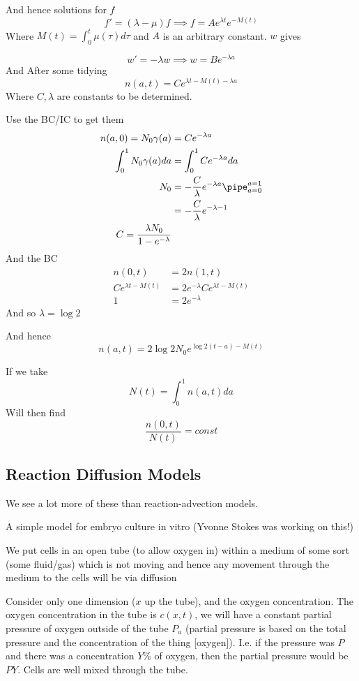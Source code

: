 \documentclass{X:/Documents/Coding/Latex/myassignment}
\begin{document}
And hence solutions for $f$
\[f' = (\lambda - \mu) f \implies f = Ae^{\lambda t} e^{-M(t)}\]
Where $M(t) = \int_0^t \mu(\tau) d \tau$ and $A$ is an arbitrary constant.
$w$ gives

\[w' = -\lambda w \implies w = Be^{-\lambda a}\]
And After some tidying
\[n(a,t) = Ce^{\lambda t - M(t) - \lambda a}\]
Where $C,\lambda$ are constants to be determined.

Use the BC/IC to get them
\begin{align*}
	n(a,0) = N_0 \gamma(a) &= Ce^{-\lambda a}\\
	\int_0^1 N_0 \gamma(a) da&=\int_0^1 Ce^{-\lambda a} da\\
	N_0 &= -\frac{C}{\lambda} e^{-\lambda a}\pipe_{a=0}^{a=1}\\ 
	&= -\frac{C}{\lambda} e^{-\lambda -1 }\\ 
	C = \frac{\lambda N_0}{1 - e^{-\lambda}}
\end{align*}
And the BC
\begin{align*}
	n(0,t) &= 2 n(1,t)\\
	Ce^{\lambda t - M(t)} &= 2e^{-\lambda} Ce^{\lambda t - M(t)} \\
	1 &= 2e^{-\lambda}
\end{align*}
And so $\lambda = \log 2$

And hence 
\[n(a,t) = 2\log 2 N_0 e^{\log 2 (t-a) - M(t)}\]

If we take
\[N(t) = \int_0^1 n(a,t) da\]
Will then find
\[\frac{n(0,t)}{N(t)} = const\]

\subsection{Reaction Diffusion Models}
We see a lot more of these than reaction-advection models.

A simple model for embryo culture in vitro (Yvonne Stokes was working on this!)

We put cells in an open tube (to allow oxygen in) within a medium of some sort (some fluid/gas) which is not moving and hence any movement through the medium to the cells will be via diffusion

Consider only one dimension ($x$ up the tube), and the oxygen concentration. The oxygen concentration in the tube is $c(x,t)$, we will have a constant partial pressure of oxygen outside of the tube $P_a$ (partial pressure is based on the total pressure and the concentration of the thing [oxygen]). I.e. if the pressure was $P$ and there was a concentration $Y\%$ of oxygen, then the partial pressure would be $PY$. Cells are well mixed through the tube.
\end{document}
